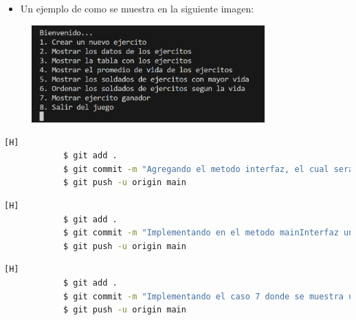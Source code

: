 \documentclass{article}
\begin{document}
        \begin{itemize}
            \begin{itemize}
                \item Un ejemplo de como se muestra en la siguiente imagen:
            \end{itemize}
        \end{itemize}
        
        \begin{figure}[H]
            \centering
            \includegraphics[width=0.8\textwidth,keepaspectratio]{img/mainInterfaz.png}
            \caption{}
        \end{figure}
    
        \begin{lstlisting}[language=bash,caption={Commit \href{https://github.com/hernanchoquehuanca/fp2-23b/commit/64fd210c75ca969277690eb4a062c3b393467098}{64fd210}: Se implementó el método mainInterfaz (PRIMER COMMIT)}][H]
    		$ git add .
    		$ git commit -m "Agregando el metodo interfaz, el cual sera utilizado para hacer nuestro programa iterativo"	
    		$ git push -u origin main
    	\end{lstlisting}

        \begin{lstlisting}[language=bash,caption={Commit \href{https://github.com/hernanchoquehuanca/fp2-23b/commit/390a95eba10e059c7a9662cba4fa90fcd0b0edf9}{390a95e}: Se implementó el switch dentro del método mainInterfaz (SEGUNDO COMMIT)}][H]
    		$ git add .
    		$ git commit -m "Implementando en el metodo mainInterfaz un switch para recibir la accion a realizar"	
    		$ git push -u origin main
    	\end{lstlisting}

        \begin{lstlisting}[language=bash,caption={Commit \href{https://github.com/hernanchoquehuanca/fp2-23b/commit/170f535a54c97bdb0ce65ff868320be5f5546e35}{170f535}: Se concluyó el switch dentro del método mainInterfaz tomando en cuenta todos los casos (ÚLTIMO COMMIT)}][H]
    		$ git add .
    		$ git commit -m "Implementando el caso 7 donde se muestra un ejercito ganador o empate, ya teniendo en cuenta la suma de vida de los soldados, esot dentro de la funcion mainInterfaz"	
    		$ git push -u origin main
    	\end{lstlisting}
        
\end{document}

